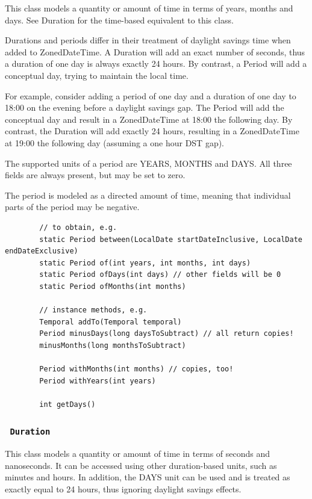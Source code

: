 \documentclass{scrartcl}
\begin{document}
    This class models a quantity or amount of time in terms of years, months and days. See Duration for the time-based equivalent to this class.

    Durations and periods differ in their treatment of daylight savings time when added to ZonedDateTime. A Duration will add an exact number of seconds, thus a duration of one day is always exactly 24 hours. By contrast, a Period will add a conceptual day, trying to maintain the local time.

    For example, consider adding a period of one day and a duration of one day to 18:00 on the evening before a daylight savings gap. The Period will add the conceptual day and result in a ZonedDateTime at 18:00 the following day. By contrast, the Duration will add exactly 24 hours, resulting in a ZonedDateTime at 19:00 the following day (assuming a one hour DST gap).

    The supported units of a period are YEARS, MONTHS and DAYS. All three fields are always present, but may be set to zero.

    The period is modeled as a directed amount of time, meaning that individual parts of the period may be negative.

    \begin{lstlisting}
        // to obtain, e.g.
        static Period between(LocalDate startDateInclusive, LocalDate endDateExclusive)
        static Period of(int years, int months, int days)
        static Period ofDays(int days) // other fields will be 0
        static Period ofMonths(int months)

        // instance methods, e.g.
        Temporal addTo(Temporal temporal)
        Period minusDays(long daysToSubtract) // all return copies!
        minusMonths(long monthsToSubtract)

        Period withMonths(int months) // copies, too!
        Period withYears(int years)

        int getDays()
        \end{lstlisting}

 \subsubsection{\lstinline$ Duration $}

    This class models a quantity or amount of time in terms of seconds and nanoseconds. It can be accessed using other duration-based units, such as minutes and hours. In addition, the DAYS unit can be used and is treated as exactly equal to 24 hours, thus ignoring daylight savings effects.
\end{document}
